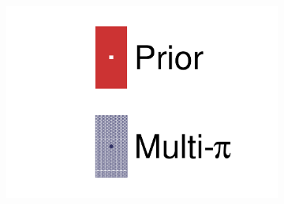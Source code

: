 \begin{figure}[h]
\begin{subfigure}[t]{0.32\textwidth}
		\includegraphics[width=\textwidth,page=24, trim={0mm 0mm 0mm 0mm}, clip]{figures/mach3/2018/data/2018a_FixedCov_RedCov_Mpi_Data_merge_drawPar_withDet}
	\end{subfigure}


\end{figure}

